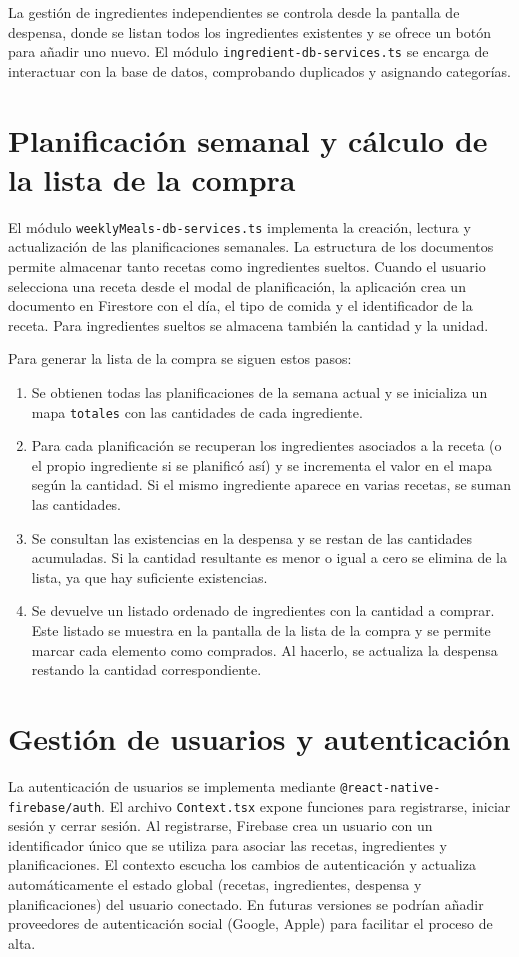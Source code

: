 \documentclass[twoside, openright, 11pt]{report}
\begin{document}
La gestión de ingredientes independientes se controla desde la pantalla de despensa, donde se listan todos los ingredientes existentes y se ofrece un botón para añadir uno nuevo. El módulo \texttt{ingredient-db-services.ts} se encarga de interactuar con la base de datos, comprobando duplicados y asignando categorías.

\section{Planificación semanal y cálculo de la lista de la compra}
El módulo \texttt{weeklyMeals-db-services.ts} implementa la creación, lectura y actualización de las planificaciones semanales. La estructura de los documentos permite almacenar tanto recetas como ingredientes sueltos. Cuando el usuario selecciona una receta desde el modal de planificación, la aplicación crea un documento en Firestore con el día, el tipo de comida y el identificador de la receta. Para ingredientes sueltos se almacena también la cantidad y la unidad.

Para generar la lista de la compra se siguen estos pasos:

\begin{enumerate}
  \item Se obtienen todas las planificaciones de la semana actual y se inicializa un mapa \texttt{totales} con las cantidades de cada ingrediente.
  \item Para cada planificación se recuperan los ingredientes asociados a la receta (o el propio ingrediente si se planificó así) y se incrementa el valor en el mapa según la cantidad. Si el mismo ingrediente aparece en varias recetas, se suman las cantidades.
  \item Se consultan las existencias en la despensa y se restan de las cantidades acumuladas. Si la cantidad resultante es menor o igual a cero se elimina de la lista, ya que hay suficiente existencias.
  \item Se devuelve un listado ordenado de ingredientes con la cantidad a comprar. Este listado se muestra en la pantalla de la lista de la compra y se permite marcar cada elemento como comprados. Al hacerlo, se actualiza la despensa restando la cantidad correspondiente.
\end{enumerate}

\section{Gestión de usuarios y autenticación}
La autenticación de usuarios se implementa mediante \texttt{@react-native-firebase/auth}. El archivo \texttt{Context.tsx} expone funciones para registrarse, iniciar sesión y cerrar sesión. Al registrarse, Firebase crea un usuario con un identificador único que se utiliza para asociar las recetas, ingredientes y planificaciones. El contexto escucha los cambios de autenticación y actualiza automáticamente el estado global (recetas, ingredientes, despensa y planificaciones) del usuario conectado. En futuras versiones se podrían añadir proveedores de autenticación social (Google, Apple) para facilitar el proceso de alta.
\end{document}
